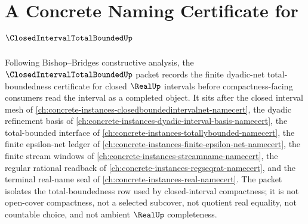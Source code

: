 \chapter{A Concrete Naming Certificate for $\ClosedIntervalTotalBoundedUp$}
\label{ch:concrete-instances-closed-interval-total-bounded-namecert}

Following Bishop--Bridges constructive analysis, the $\ClosedIntervalTotalBoundedUp$ packet records the finite dyadic-net total-boundedness certificate for closed $\RealUp$ intervals before compactness-facing consumers read the interval as a completed object. It sits after the closed interval mesh of \autoref{ch:concrete-instances-closedboundedintervalnet-namecert}, the dyadic refinement basis of \autoref{ch:concrete-instances-dyadic-interval-basis-namecert}, the total-bounded interface of \autoref{ch:concrete-instances-totallybounded-namecert}, the finite epsilon-net ledger of \autoref{ch:concrete-instances-finite-epsilon-net-namecert}, the finite stream windows of \autoref{ch:concrete-instances-streamname-namecert}, the regular rational readback of \autoref{ch:concrete-instances-regseqrat-namecert}, and the terminal real-name seal of \autoref{ch:concrete-instances-real-namecert}. The packet isolates the total-boundedness row used by closed-interval compactness; it is not open-cover compactness, not a selected subcover, not quotient real equality, not countable choice, and not ambient $\RealUp$ completeness.

